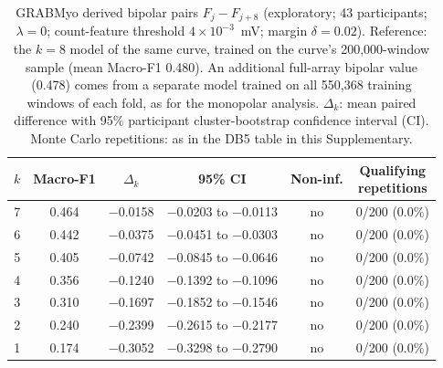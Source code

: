 \begin{table}[htbp]
\centering
\small
\caption{GRABMyo derived bipolar pairs $F_j - F_{j+8}$ (exploratory; 43 participants; $\lambda = 0$; count-feature threshold $4 \times 10^{-3}$~mV; margin $\delta = 0.02$). Reference: the $k = 8$ model of the same curve, trained on the curve's 200,000-window sample (mean Macro-F1 0.480). An additional full-array bipolar value (0.478) comes from a separate model trained on all 550{,}368 training windows of each fold, as for the monopolar analysis. $\Delta_k$: mean paired difference with 95\% participant cluster-bootstrap confidence interval (CI). Monte Carlo repetitions: as in the DB5 table in this Supplementary.}
\label{tab:bipolar}
\setlength{\tabcolsep}{4pt}
\begin{adjustbox}{max width=\textwidth}
\begin{tabular}{rccccc}
\toprule
$k$ & Macro-F1 & $\Delta_k$ & 95\% CI & Non-inf. & \makecell{Qualifying\\repetitions} \\
\midrule
7 & 0.464 & $-$0.0158 & $-$0.0203 to $-$0.0113 & no & 0/200 (0.0\%) \\
6 & 0.442 & $-$0.0375 & $-$0.0451 to $-$0.0303 & no & 0/200 (0.0\%) \\
5 & 0.405 & $-$0.0742 & $-$0.0845 to $-$0.0646 & no & 0/200 (0.0\%) \\
4 & 0.356 & $-$0.1240 & $-$0.1392 to $-$0.1096 & no & 0/200 (0.0\%) \\
3 & 0.310 & $-$0.1697 & $-$0.1852 to $-$0.1546 & no & 0/200 (0.0\%) \\
2 & 0.240 & $-$0.2399 & $-$0.2615 to $-$0.2177 & no & 0/200 (0.0\%) \\
1 & 0.174 & $-$0.3052 & $-$0.3298 to $-$0.2790 & no & 0/200 (0.0\%) \\
\bottomrule
\end{tabular}
\end{adjustbox}
\end{table}
